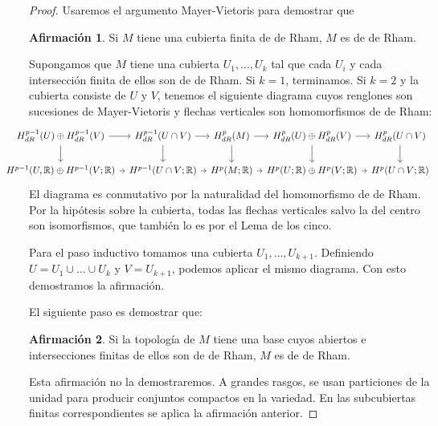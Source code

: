 \documentclass[spanish]{article}
\theoremstyle{definition}
\newtheorem{af}{Afirmación}
\newcommand{\R}{\mathbb{R}}
\begin{document}
\begin{proof}
		 Usaremos el argumento Mayer-Vietoris para demostrar que
			\begin{af}
			Si $M$ tiene una cubierta finita de de Rham, $M$ es de de Rham.
		\end{af}
		Supongamos que $M$ tiene una cubierta $U_1,\ldots,U_k$ tal que cada $U_i$ y cada intersección finita de ellos son de de Rham. Si $k=1$, terminamos. Si $k=2$ y la cubierta consiste de $U$ y $V$, tenemos el siguiente diagrama cuyos renglones son sucesiones de Mayer-Vietoris y flechas verticales son homomorfismos de de Rham:
		\[\hspace{-1cm}\begin{tikzcd}[column sep=tiny]
			H_{dR}^{p-1}(U)\oplus H_{dR}^{p-1}(V)\arrow[r]\arrow[d]&H_{dR}^{p-1}(U\cap V)\arrow[d]\arrow[r]&H^p_{dR}(M)\arrow[d]\arrow[r]&H_{dR}^p(U)\oplus H_{dR}^p(V)\arrow[d]\arrow[r]&H^p_{dR}(U\cap V)\arrow[d]\\
			H^{p-1}(U,\R)\oplus H^{p-1}(V;\R)\arrow[r]&H^{p-1}(U\cap V;\R)\arrow[r]&H^p(M;\R)\arrow[r]&H^p(U;\R)\oplus H^p(V;\R)\arrow[r]&H^p(U\cap V;\R)
		\end{tikzcd}\]
		El diagrama es conmutativo por la naturalidad del homomorfismo de de Rham. Por la hipótesis sobre la cubierta, todas las flechas verticales salvo la del centro son isomorfismos, que también lo es por el Lema de los cinco.
		
		Para el paso inductivo tomamos una cubierta $U_1,\ldots,U_{k+1}$. Definiendo $U=U_1\cup \ldots\cup U_k$ y $V=U_{k+1}$, podemos aplicar el mismo diagrama. Con esto demostramos la afirmación.
		
		El siguiente paso es demostrar que:
		
		\begin{af}
			Si la topología de $M$ tiene una base cuyos abiertos e intersecciones finitas de ellos son de de Rham, $M$ es de de Rham.
		\end{af}
		Esta afirmación no la demostraremos. A grandes rasgos, se usan particiones de la unidad para producir conjuntos compactos en la variedad. En las subcubiertas finitas correspondientes se aplica la afirmación anterior.
		

\end{proof}
\end{document}
